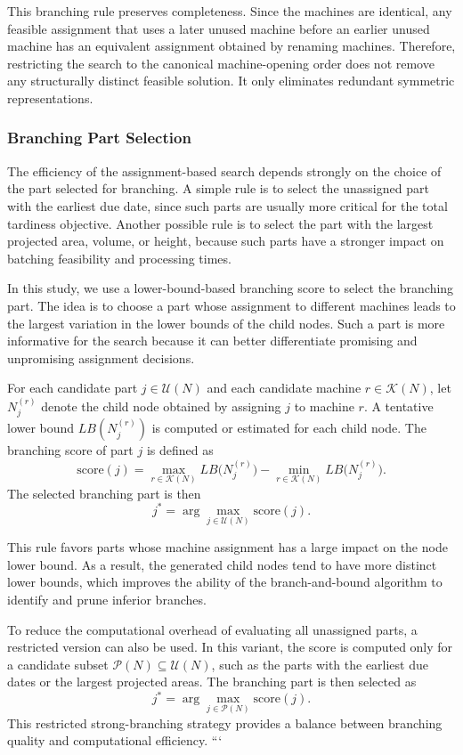 \documentclass[review,3p,times,authoryear]{elsarticle}
\begin{document}
This branching rule preserves completeness. Since the machines are
identical, any feasible assignment that uses a later unused machine before
an earlier unused machine has an equivalent assignment obtained by
renaming machines. Therefore, restricting the search to the canonical
machine-opening order does not remove any structurally distinct feasible
solution. It only eliminates redundant symmetric representations.

\subsubsection{Branching Part Selection}

The efficiency of the assignment-based search depends strongly on the
choice of the part selected for branching. A simple rule is to select the
unassigned part with the earliest due date, since such parts are usually
more critical for the total tardiness objective. Another possible rule is
to select the part with the largest projected area, volume, or height,
because such parts have a stronger impact on batching feasibility and
processing times.

In this study, we use a lower-bound-based branching score to select the
branching part. The idea is to choose a part whose assignment to different
machines leads to the largest variation in the lower bounds of the child
nodes. Such a part is more informative for the search because it can better
differentiate promising and unpromising assignment decisions.

For each candidate part $j\in\mathcal{U}(N)$ and each candidate machine
$r\in\mathcal{K}(N)$, let $N_j^{(r)}$ denote the child node obtained by
assigning $j$ to machine $r$. A tentative lower bound $LB(N_j^{(r)})$ is
computed or estimated for each child node. The branching score of part $j$
is defined as
\[
\mathrm{score}(j)
=
\max_{r\in\mathcal{K}(N)} LB\bigl(N_j^{(r)}\bigr)
-
\min_{r\in\mathcal{K}(N)} LB\bigl(N_j^{(r)}\bigr).
\]
The selected branching part is then
\[
j^*=\arg\max_{j\in\mathcal{U}(N)} \mathrm{score}(j).
\]

This rule favors parts whose machine assignment has a large impact on the
node lower bound. As a result, the generated child nodes tend to have more
distinct lower bounds, which improves the ability of the branch-and-bound
algorithm to identify and prune inferior branches.

To reduce the computational overhead of evaluating all unassigned parts, a
restricted version can also be used. In this variant, the score is computed
only for a candidate subset $\mathcal{P}(N)\subseteq\mathcal{U}(N)$, such as
the parts with the earliest due dates or the largest projected areas. The
branching part is then selected as
\[
j^*=\arg\max_{j\in\mathcal{P}(N)} \mathrm{score}(j).
\]
This restricted strong-branching strategy provides a balance between
branching quality and computational efficiency.
```
\end{document}
